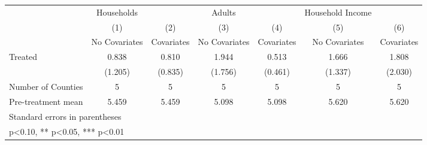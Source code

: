{
\def\sym#1{\ifmmode^{#1}\else\(^{#1}\)\fi}
\begin{tabular}{l*{6}{c}}
\hline\hline
            &  Households   &               &      Adults   &               &Household Income   &               \\
            &\multicolumn{1}{c}{(1)}&\multicolumn{1}{c}{(2)}&\multicolumn{1}{c}{(3)}&\multicolumn{1}{c}{(4)}&\multicolumn{1}{c}{(5)}&\multicolumn{1}{c}{(6)}\\
            &\multicolumn{1}{c}{No Covariates}&\multicolumn{1}{c}{Covariates}&\multicolumn{1}{c}{No Covariates}&\multicolumn{1}{c}{Covariates}&\multicolumn{1}{c}{No Covariates}&\multicolumn{1}{c}{Covariates}\\
\hline
Treated     &       0.838   &       0.810   &       1.944   &       0.513   &       1.666   &       1.808   \\
            &     (1.205)   &     (0.835)   &     (1.756)   &     (0.461)   &     (1.337)   &     (2.030)   \\
\hline
Number of Counties&           5   &           5   &           5   &           5   &           5   &           5   \\
Pre-treatment mean&       5.459   &       5.459   &       5.098   &       5.098   &       5.620   &       5.620   \\
\hline\hline
\multicolumn{7}{l}{\footnotesize Standard errors in parentheses}\\
\multicolumn{7}{l}{\footnotesize * p<0.10, ** p<0.05, *** p<0.01}\\
\end{tabular}
}

